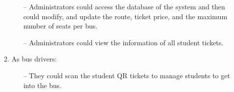 \begin{itemize}
\begin{enumerate}
\begin{enumerate}
        \item[--] Administrators could access the database of the system and then could modify, and update the route, ticket price, and the maximum number of seats per bus.

        \item[--] Administrators could view the information of all student tickets. 
    \end{enumerate}


        \item As bus drivers:
    \begin{enumerate}
        \item[--] They could scan the student QR tickets to manage students to get into the bus. 
    \end{enumerate}
        
    \end{enumerate}
    
      
\end{itemize}